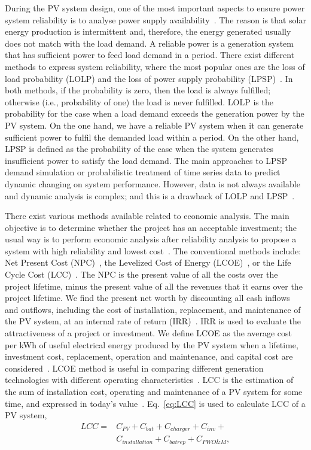 \documentclass[journal]{IEEEtran}
\begin{document}
During the PV system design, one of the most important aspects to ensure power system reliability is to analyse power supply availability~\cite{Alsadi2018}. The reason is that solar energy production is intermittent and, therefore, the energy generated usually does not match with the load demand. A reliable power is a generation system that has sufficient power to feed load demand in a period. There exist different methods to express system reliability, where the most popular ones are the loss of load probability (LOLP) and the loss of power supply probability (LPSP)~\cite{Alsadi2018}. In both methods, if the probability is zero, then the load is always fulfilled; otherwise (i.e., probability of one) the load is never fulfilled. LOLP is the probability for the case when a load demand exceeds the generation power by the PV system. On the one hand,  we have a reliable PV system when it can generate sufficient power to fulfil the demanded load within a period. On the other hand, LPSP is defined as the probability of the case when the system generates insufficient power to satisfy the load demand. The main approaches to LPSP demand simulation or probabilistic treatment of time series data to predict dynamic changing on system performance. However, data is not always available and dynamic analysis is complex; and this is a drawback of LOLP and LPSP~\cite{Alsadi2018}.

There exist various methods available related to economic analysis. The main objective is to determine whether the project has an acceptable investment; the usual way is to perform economic analysis after reliability analysis to propose a system with high reliability and lowest cost~\cite{Alsadi2018}. The conventional methods include: Net Present Cost (NPC)~\cite{Park2004}, the Levelized Cost of Energy (LCOE)~\cite{Zhou2010}, or the Life Cycle Cost (LCC)~\cite{Applasamy2011}. The NPC is the present value of all the costs over the project lifetime, minus the present value of all the revenues that it earns over the project lifetime. We find the present net worth by discounting all cash inflows and outflows, including the cost of installation, replacement, and maintenance of the PV system, at an internal rate of return (IRR)~\cite{Park2004}. IRR is used to evaluate the attractiveness of a project or investment. We define LCOE as the average cost per kWh of useful electrical energy produced by the PV system when a lifetime, investment cost, replacement, operation and maintenance, and capital cost are considered~\cite{Kamel2005}. LCOE method is useful in comparing different generation technologies with different operating characteristics~\cite{Zhou2010}. LCC is the estimation of the sum of installation cost, operating and maintenance of a PV system for some time, and expressed in today's value~\cite{Applasamy2011}. Eq.~\eqref{eq:LCC} is used to calculate LCC of a PV system,
%
\begin{equation}
\label{eq:LCC}
\begin{aligned}
LCC = & C_{PV} + C_{bat} + C_{charger} + C_{inv} + \\
      & C_{installation} + C_{batrep} + C_{PWO\&M},
\end{aligned}
\end{equation}
\end{document}
